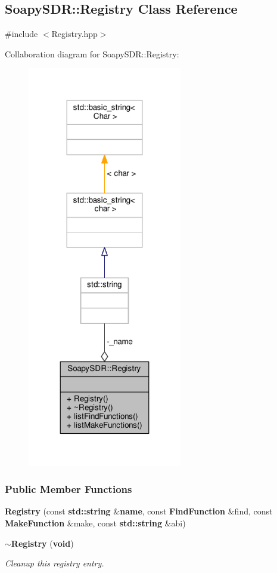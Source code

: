 \subsection{Soapy\+S\+DR\+:\+:Registry Class Reference}
\label{classSoapySDR_1_1Registry}


{\ttfamily \#include $<$Registry.\+hpp$>$}



Collaboration diagram for Soapy\+S\+DR\+:\+:Registry\+:
\nopagebreak
\begin{figure}[H]
\begin{center}
\leavevmode
\includegraphics[width=191pt]{df/df9/classSoapySDR_1_1Registry__coll__graph}
\end{center}
\end{figure}
\subsubsection*{Public Member Functions}
\begin{DoxyCompactItemize}
\item 
{\bf Registry} (const {\bf std\+::string} \&{\bf name}, const {\bf Find\+Function} \&find, const {\bf Make\+Function} \&make, const {\bf std\+::string} \&abi)
\item 
{\bf $\sim$\+Registry} ({\bf void})
\begin{DoxyCompactList}\small\item\em Cleanup this registry entry. \end{DoxyCompactList}\end{DoxyCompactItemize}

